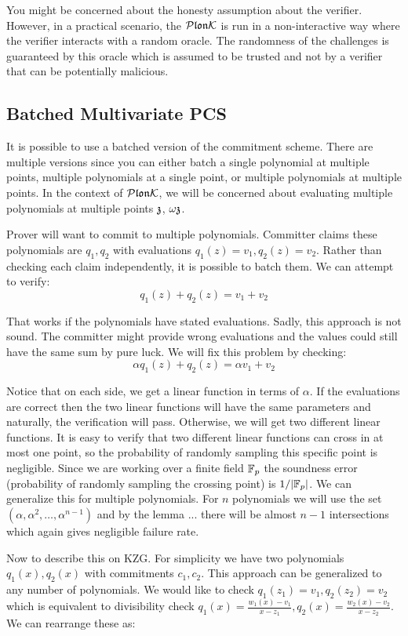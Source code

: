 You might be concerned about the honesty assumption about the verifier. However, in a practical scenario, the $\mathcal{P}\mathfrak{lon}\mathcal{K}$ is run in a non-interactive way where the verifier interacts with a random oracle. The randomness of the challenges is guaranteed by this oracle which is assumed to be trusted and not by a verifier that can be potentially malicious.

\subsection{Batched Multivariate PCS}
It is possible to use a batched version of the commitment scheme. There are multiple versions since you can either batch a single polynomial at multiple points, multiple polynomials at a single point, or multiple polynomials at multiple points. In the context of $\mathcal{P}\mathfrak{lon}\mathcal{K}$, we will be concerned about evaluating multiple polynomials at multiple points $\mathfrak{z}$, $\omega\mathfrak{z}$.

Prover will want to commit to multiple polynomials. Committer claims these polynomials are $q_1, q_2$ with evaluations $q_1(z) = v_1, q_2(z) = v_2$. Rather than checking each claim independently, it is possible to batch them. We can attempt to verify: $$q_1(z) + q_2(z) = v_1 + v_2$$ 

That works if the polynomials have stated evaluations. Sadly, this approach is not sound. The committer might provide wrong evaluations and the values could still have the same sum by pure luck. We will fix this problem by checking:
$$\alpha q_1(z) + q_2(z) = \alpha v_1 + v_2$$

Notice that on each side, we get a linear function in terms of $\alpha$. If the evaluations are correct then the two linear functions will have the same parameters and naturally, the verification will pass. Otherwise, we will get two different linear functions. It is easy to verify that two different linear functions can cross in at most one point, so the probability of randomly sampling this specific point is negligible. Since we are working over a finite field $\mathbb{F}_p$ the soundness error (probability of randomly sampling the crossing point) is $1 / |\mathbb{F}_p|$. We can generalize this for multiple polynomials. For $n$ polynomials we will use the set $(\alpha, \alpha^2, \ldots,\alpha^{n-1})$ and by the lemma ... there will be almost $n-1$ intersections which again gives negligible failure rate.

Now to describe this on KZG. For simplicity we have two polynomials $q_1(x), q_2(x)$ with commitments $c_1, c_2$. This approach can be generalized to any number of polynomials. We would like to check $q_1(z_1) = v_1, q_2(z_2) = v_2$ which is equivalent to divisibility check $q_1(x) = \frac{w_1(x) - v_1}{x - z_1}, q_2(x) = \frac{w_2(x) - v_2}{x - z_2}$. We can rearrange these as:


